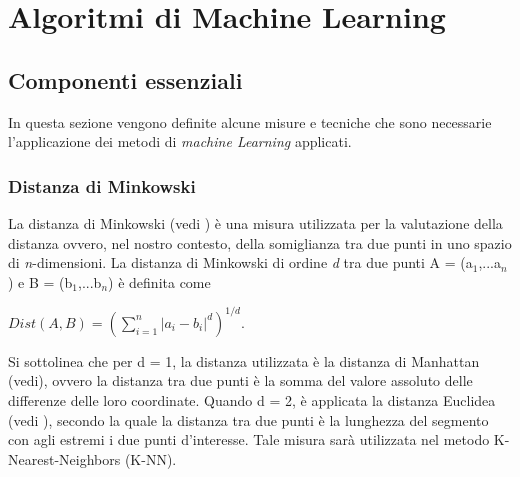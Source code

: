 
\chapter{Algoritmi di Machine Learning}
\label{cap:ML}
\section{Componenti essenziali}
In questa sezione vengono definite alcune misure e tecniche che sono necessarie l'applicazione dei metodi di \emph{machine Learning} applicati.
\subsection{Distanza di Minkowski}
La distanza di Minkowski (vedi \textit{\cite{minkdist}}) è una misura utilizzata per la valutazione della distanza ovvero, nel nostro contesto, della somiglianza tra due punti in uno spazio di \textit{n}-dimensioni. La distanza di Minkowski di ordine \emph{d} tra due punti A = (a$_1$,...a$_n$) e B = (b$_1$,...b$_n$) è definita come
\begin{center}
	$Dist(A,B) =  \left(\sum_{i = 1}^{n}|a_i-b_i|^d\right)^{1/d} $.
\end{center}

Si sottolinea che per d = 1, la distanza utilizzata è la distanza di Manhattan (vedi\textit{\cite{manhattan}}), ovvero la distanza tra due punti è la somma del valore assoluto delle differenze delle loro coordinate. Quando d = 2, è applicata la distanza Euclidea (vedi \textit{\cite{euclidea}}), secondo la quale la distanza tra due punti è la lunghezza del segmento con agli estremi i due punti d'interesse.
Tale misura sarà utilizzata nel metodo K-Nearest-Neighbors (K-NN).
